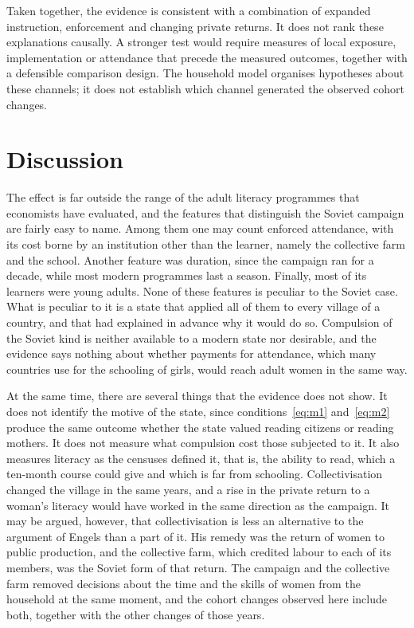 \documentclass[12pt]{article}
\begin{document}
Taken together, the evidence is consistent with a combination of expanded instruction, enforcement and changing private returns. It does not rank these explanations causally. A stronger test would require measures of local exposure, implementation or attendance that precede the measured outcomes, together with a defensible comparison design. The household model organises hypotheses about these channels; it does not establish which channel generated the observed cohort changes.


\section{Discussion}\label{sec:disc}

The effect is far outside the range of the adult literacy programmes that economists have evaluated, and the features that distinguish the Soviet campaign are fairly easy to name. Among them one may count enforced attendance, with its cost borne by an institution other than the learner, namely the collective farm and the school. Another feature was duration, since the campaign ran for a decade, while most modern programmes last a season. Finally, most of its learners were young adults. None of these features is peculiar to the Soviet case. What is peculiar to it is a state that applied all of them to every village of a country, and that had explained in advance why it would do so. Compulsion of the Soviet kind is neither available to a modern state nor desirable, and the evidence says nothing about whether payments for attendance, which many countries use for the schooling of girls, would reach adult women in the same way.

At the same time, there are several things that the evidence does not show. It does not identify the motive of the state, since conditions~\eqref{eq:m1} and~\eqref{eq:m2} produce the same outcome whether the state valued reading citizens or reading mothers. It does not measure what compulsion cost those subjected to it. It also measures literacy as the censuses defined it, that is, the ability to read, which a ten-month course could give and which is far from schooling. Collectivisation changed the village in the same years, and a rise in the private return to a woman's literacy would have worked in the same direction as the campaign. It may be argued, however, that collectivisation is less an alternative to the argument of Engels than a part of it. His remedy was the return of women to public production, and the collective farm, which credited labour to each of its members, was the Soviet form of that return. The campaign and the collective farm removed decisions about the time and the skills of women from the household at the same moment, and the cohort changes observed here include both, together with the other changes of those years.
\end{document}
